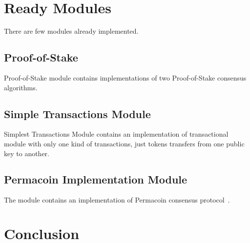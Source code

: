 \documentclass[]{report}   %
\begin{document}
\section{Ready Modules}
There are few modules already implemented.

\subsection{Proof-of-Stake}
Proof-of-Stake module contains implementations of two Proof-of-Stake consensus algorithms. 

\subsection{Simple Transactions Module}

Simplest Transactions Module contains an implementation of transactional module with only one kind of transactions, just tokens transfers from one public key to another.

\subsection{Permacoin Implementation Module}

The module contains an implementation of Permacoin consensus protocol~\cite{miller2014permacoin}.

\section{Conclusion}



\end{document}
